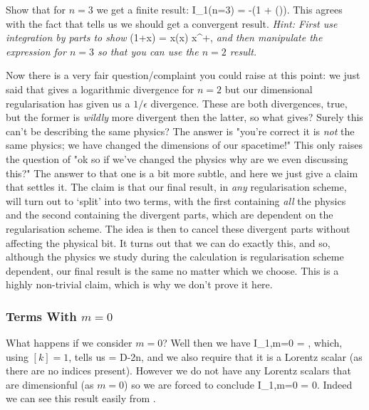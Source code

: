 \bbox 
    Show that for $n=3$ we get a finite result:
    \bse 
        I_1(n=3) = -\big(1 + \cO(\epsilon)\big).
    \ese 
    This agrees with the fact that  tells us we should get a convergent result. \textit{Hint: First use integration by parts to show}
    \bse 
        \Gamma(1+x) = x\Gamma(x) \qquad x\in \R^+,
    \ese 
    \textit{and then manipulate the expression for $n=3$ so that you can use the $n=2$ result.}
\ebox 

\br 
    Now there is a very fair question/complaint you could raise at this point: we just said that  gives a logarithmic divergence for $n=2$ but our dimensional regularisation has given us a $1/\epsilon$ divergence. These are both divergences, true, but the former is \textit{wildly} more divergent then the latter, so what gives? Surely this can't be describing the same physics? The answer is "you're correct it is \textit{not} the same physics; we have changed the dimensions of our spacetime!" This only raises the question of "ok so if we've changed the physics why are we even discussing this?" The answer to that one is a bit more subtle, and here we just give a claim that settles it. The claim is that our final result, in \textit{any} regularisation scheme, will turn out to `split' into two terms, with the first containing \textit{all} the physics and the second containing the divergent parts, which are dependent on the regularisation scheme. The idea is then to cancel these divergent parts without affecting the physical bit. It turns out that we can do exactly this, and so, although the physics we study during the calculation is regularisation scheme dependent, our final result is the same no matter which we choose. This is a highly non-trivial claim, which is why we don't prove it here.
\er 

\subsubsection{Terms With $m=0$}

What happens if we consider $m=0$? Well then we have 
\bse 
    I_{1,m=0} = \int {} ,
\ese 
which, using $[k]=1$, tells us 
\bse 
    [I_{1,m=0}] = D-2n,
\ese 
and we also require that it is a Lorentz scalar (as there are no indices present). However we do not have any Lorentz scalars that are dimensionful (as $m=0$) so we are forced to conclude 
\bse 
    I_{1,m=0} = 0. 
\ese 
Indeed we can see this result easily from .

